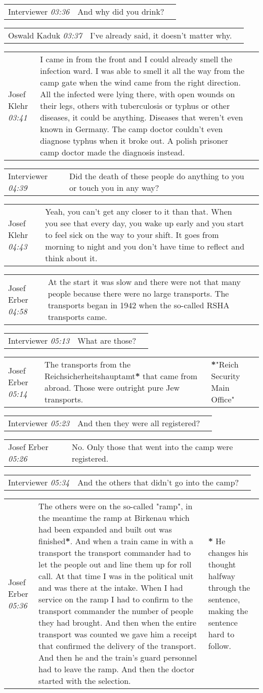\documentclass{article}
\newcommand{\I}{Interviewer}
\newcommand{\OK}{Oswald Kaduk}
\newcommand{\JE}{Josef Erber}
\newcommand{\JK}{Josef Klehr}
\newcommand{\dialogueentry}[4]{
    \begin{center}
    \begin{tabular}{p{1in} p{3.5in} p{1.5in}} 
        #2 \newline \textit{#1} & #3 & \small{#4} 
    \end{tabular}
    \end{center}
}
\newcommand{\seenote}[1]{\textbf{#1}}
\newcommand{\twolinebreak}{\newline \newline}
\begin{document}
\dialogueentry{03:36}{\I}{And why did you drink?}{}

\dialogueentry{03:37}{\OK}{I've already said, it doesn't matter why.}{}

\dialogueentry{03:41}{\JK}{I came in from the front and I could already smell the infection ward. I was able to smell it all the way from the camp gate when the wind came from the right direction. 
\twolinebreak
All the infected were lying there, with open wounds on their legs, others with tuberculosis or typhus or other diseases, it could be anything. Diseases that weren't even known in Germany. The camp doctor couldn't even diagnose typhus when it broke out. A polish prisoner camp doctor made the diagnosis instead.}{}

\dialogueentry{04:39}{\I}{Did the death of these people do anything to you or touch you in any way?}{}

\dialogueentry{04:43}{\JK}{Yeah, you can't get any closer to it than that. When you see that every day, you wake up early and you start to feel sick on the way to your shift. It goes from morning to night and you don't have time to reflect and think about it.}{}

\dialogueentry{04:58}{\JE}{At the start it was slow and there were not that many people because there were no large transports. The transports began in 1942 when the so-called RSHA transports came.}{}

\dialogueentry{05:13}{\I}{What are those?}{}

\dialogueentry{05:14}{\JE}{The transports from the Reichsicherheitshauptamt\seenote{*}  that came from abroad. Those were outright pure Jew transports.}{\seenote{*}"Reich Security Main Office"}

\dialogueentry{05:23}{\I}{And then they were all registered?}{}

\dialogueentry{05:26}{\JE}{No. Only those that went into the camp were registered.}{}

\dialogueentry{05:34}{\I}{And the others that didn't go into the camp?}{}

\dialogueentry{05:36}{\JE}{The others were on the so-called "ramp", in the meantime the ramp at Birkenau which had been expanded and built out was finished\seenote{*}. And when a train came in with a transport the transport commander had to let the people out and line them up for roll call. 
\twolinebreak
At that time I was in the political unit and was there at the intake. When I had service on the ramp I had to confirm to the transport commander the number of people they had brought. And then when the entire transport was counted we gave him a receipt that confirmed the delivery of the transport. And then he and the train's guard personnel had to leave the ramp. And then the doctor started with the selection.}{\seenote{*} He changes his thought halfway through the sentence, making the sentence hard to follow. }
\end{document}
